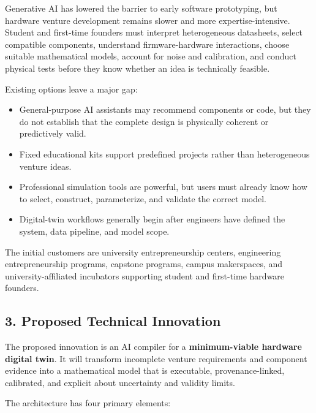 \documentclass[12pt,letterpaper]{article}
\begin{document}
Generative AI has lowered the barrier to early software prototyping, but hardware venture development remains slower and more expertise-intensive. Student and first-time founders must interpret heterogeneous datasheets, select compatible components, understand firmware-hardware interactions, choose suitable mathematical models, account for noise and calibration, and conduct physical tests before they know whether an idea is technically feasible.

Existing options leave a major gap:

\begin{itemize}
    \item General-purpose AI assistants may recommend components or code, but they do not establish that the complete design is physically coherent or predictively valid.
    \item Fixed educational kits support predefined projects rather than heterogeneous venture ideas.
    \item Professional simulation tools are powerful, but users must already know how to select, construct, parameterize, and validate the correct model.
    \item Digital-twin workflows generally begin after engineers have defined the system, data pipeline, and model scope.
\end{itemize}

The initial customers are university entrepreneurship centers, engineering entrepreneurship programs, capstone programs, campus makerspaces, and university-affiliated incubators supporting student and first-time hardware founders.

\subsection*{3. Proposed Technical Innovation}

The proposed innovation is an AI compiler for a \textbf{minimum-viable hardware digital twin}. It will transform incomplete venture requirements and component evidence into a mathematical model that is executable, provenance-linked, calibrated, and explicit about uncertainty and validity limits.

The architecture has four primary elements:
\end{document}
